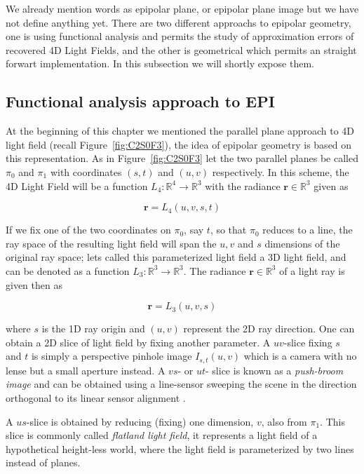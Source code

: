 \bigskip

We already mention words as epipolar plane, or epipolar plane image but we have not define anything yet. There are two different approachs to epipolar geometry, one is using functional analysis and permits the study of approximation errors of recovered 4D Light Fields, and the other is geometrical which permits an straight forwart implementation. In this subsection we will shortly expose them. 

\subsection{Functional analysis approach to EPI}

At the beginning of this chapter we mentioned the parallel plane approach to 4D light field (recall Figure~\ref{fig:C2S0F3}), the idea of epipolar geometry is based on this representation. As in Figure~\ref{fig:C2S0F3} let the two parallel planes be called $\pi_0$ and $\pi_1$ with coordinates $(s,t)$ and $(u,v)$ respectively. In this scheme, the 4D Light Field will be a function $L_4:\mathbb{R}^4\longrightarrow\mathbb{R}^3$ with the radiance $\mathbf{r}\in\mathbb{R}^3$ given as

$$
\mathbf{r}=L_4(u,v,s,t)
$$

If we fix one of the two coordinates on $\pi_0$, say $t$, so that $\pi_0$ reduces to a line, the ray space of the resulting light field will span the $u,v$ and $s$ dimensions of the original ray space; lets called this parameterized light field a 3D light field, and can be denoted as a function $L_3:\mathbb{R}^3\longrightarrow\mathbb{R}^3$. The radiance $\mathbf{r}\in\mathbb{R}^3$ of a light ray is given then as

$$
\mathbf{r}=L_3(u,v,s)
$$

where $s$ is the 1D ray origin and $(u,v)$ represent the 2D ray direction. One can obtain a 2D slice of light field by fixing another parameter. A $uv$-slice fixing $s$ and $t$ is simply a perspective pinhole image $I_{s,t}(u,v)$ which is a camera with no lense but a small aperture instead. A $vs$- or $ut$- slice is known as a \textit{push-broom image} and can be obtained using a line-sensor sweeping the scene in the direction orthogonal to its linear sensor alignment \cite{Gupta}. 


 A $us$-slice is obtained by reducing (fixing) one dimension, $v$, also from $\pi_1$. This slice is commonly called \textit{flatland light field}, it represents a light field of a hypothetical height-less world, where the light field is parameterized by two lines instead of planes.

